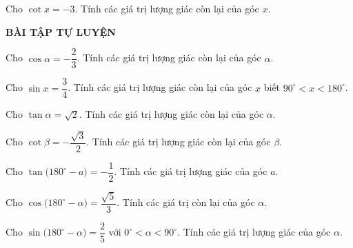 \begin{vd}%
Cho $\cot x=-3$. Tính các giá trị lượng giác còn lại của góc $x$.
\end{vd}
\begin{center}
\textbf{BÀI TẬP TỰ LUYỆN}
\end{center}
\begin{bt}%
Cho $\cos\alpha=-\dfrac{2}{3}$. Tính các giá trị lượng giác còn lại của góc $\alpha$.
\end{bt}
\begin{bt}%
Cho $\sin x=\dfrac{3}{4}$. Tính các giá trị lượng giác còn lại của góc $x$ biết $90^{\circ}<x<180^{\circ}$.
\end{bt}
\begin{bt}%
Cho $\tan \alpha =\sqrt{2}$. Tính các giá trị lượng giác còn lại của góc $\alpha$.
\end{bt}
\begin{bt}%
Cho $\cot \beta=-\dfrac{\sqrt{3}}{2}$. Tính các giá trị lượng giác còn lại của góc $\beta$.
\end{bt}
\begin{bt}%
Cho $\tan\bigl(180^{\circ}-a\bigr)=-\dfrac{1}{2}$. Tính các giá trị lượng giác của góc $a$.
\end{bt}
\begin{bt}%
Cho $\cos\bigl(180^{\circ}-\alpha\bigr)=\dfrac{\sqrt{5}}{3}$. Tính các giá trị còn lại của góc $\alpha$.
\end{bt}
\begin{bt}%
Cho $\sin\bigl(180^{\circ}-\alpha\bigr)=\dfrac{2}{5}$ với $0^{\circ}<\alpha<90^{\circ}$. Tính các giá trị lượng giác của góc $\alpha$.
\end{bt}

